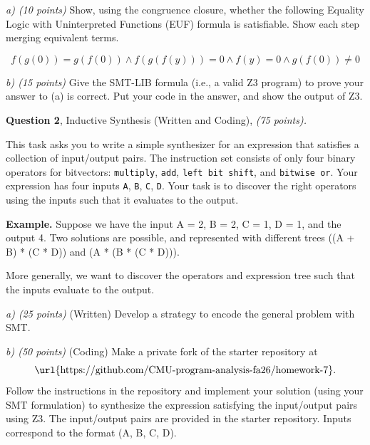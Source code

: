 \documentclass[11pt]{article}
\newcommand{\question}[3]
  {\bigskip \noindent
  {\bf Question #1}, {#2}, {\it(#3 points).}}
\begin{document}
\noindent\emph{a) (10 points)} Show, using the congruence closure, whether the following Equality Logic with
Uninterpreted Functions (EUF) formula is
satisfiable. Show each step merging equivalent terms.

\[
f(g(0)) = g(f(0)) \land f(g(f(y))) = 0 \land f(y) = 0 \land g(f(0)) \neq 0
\]

\vspace{1em}
\noindent\emph{b) (15 points)} Give the SMT-LIB formula (i.e., a valid Z3 program) to prove your answer to (a) is
correct. Put your code in the answer, and show the output of Z3.


\newpage

\question{2}{Inductive Synthesis (Written and Coding)}{75}

This task asks you to write a simple synthesizer for an expression that satisfies a
collection of input/output pairs. The instruction set consists of only four
binary operators for bitvectors: \texttt{multiply}, \texttt{add}, \texttt{left
  bit shift}, and \texttt{bitwise or}. Your expression has four inputs \texttt{A},
\texttt{B}, \texttt{C}, \texttt{D}. Your task is to discover the right
operators using the inputs such that it evaluates to the output.

\textbf{Example.} Suppose we have the input A = 2, B = 2, C = 1, D = 1, and the
output 4. Two solutions are possible, and represented with different trees ((A +
B) * (C * D)) and (A * (B * (C * D))).


More generally, we want to discover the operators and expression tree such that
the inputs evaluate to the output.

\vspace{1em}
\noindent\emph{a) (25 points)} (Written) Develop a strategy to encode the general problem with SMT.

\vspace{1em}
\noindent\emph{b) (50 points)} (Coding) 
Make a private fork of the starter repository at
\[\text{\url{https://github.com/CMU-program-analysis-fa26/homework-7}}.\] Follow the instructions in the repository and implement your solution (using your SMT
formulation) to synthesize the expression satisfying the input/output pairs
using Z3. The input/output pairs are provided in the starter repository. Inputs
correspond to the format (A, B, C, D).
\end{document}
